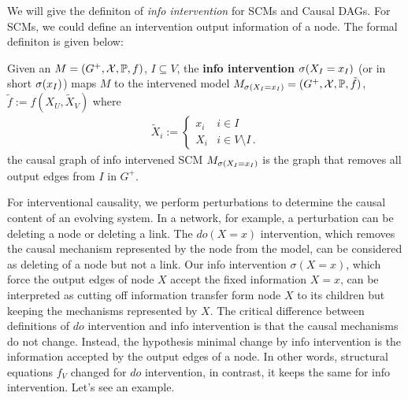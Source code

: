 We will give the definiton of \emph{info intervention} for SCMs and Causal DAGs. For SCMs, we could define an intervention output information of a node. The formal definiton is given below:

\begin{Def}
	\label{def:i-intervention}
	Given an \SCM $M=(G^+,\mathcal{X},\mathbb{P}, f)$, $I \subseteq V$, the \textbf{info intervention} $\mathrm{\sigma}(X_I=x_I)$ (or in short $\mathrm{\sigma}(x_I)$) maps $M$ to the intervened model $M_{\sigma(X_I = x_I)} = (G^+,\mathcal{X},\mathbb{P}, \tilde{f})$, $\tilde{f} := f(X_U, \tilde{X}_V)$ where
	$$
	\begin{aligned}
	\tilde{X}_i := \begin{cases}
	x_i & i \in I \\
	X_i & i \in V \setminus I \,.
	\end{cases}
	\end{aligned}
	$$
	the causal graph of info intervened SCM $M_{\mathrm{\sigma}(X_I=x_I)}$  is the graph that removes all output edges from $I$ in $G^+$.
\end{Def}

For interventional causality, {{we perform perturbations to determine the causal content\cite{zenil2019causal} of an evolving system}}. In a network, for example, a perturbation can be deleting a node or deleting a link. The $do(X=x)$ intervention, which removes the causal mechanism represented by the node  from the model,  can be considered as deleting of a node but not a link. Our info intervention $\sigma(X=x)$, which force the output edges of node $X$ accept the fixed information $X=x$,  can be interpreted as cutting off information transfer form node $X$ to its children but keeping the mechanisms represented by  $X$. The critical difference between definitions of $do$ intervention and info intervention is that the causal mechanisms do not change. Instead, the hypothesis minimal change by info intervention is the information accepted by the output edges of a node. In other words, structural equations $f_V$ changed for $do$ intervention, in contrast, it keeps the same for info intervention. Let's see an example.


